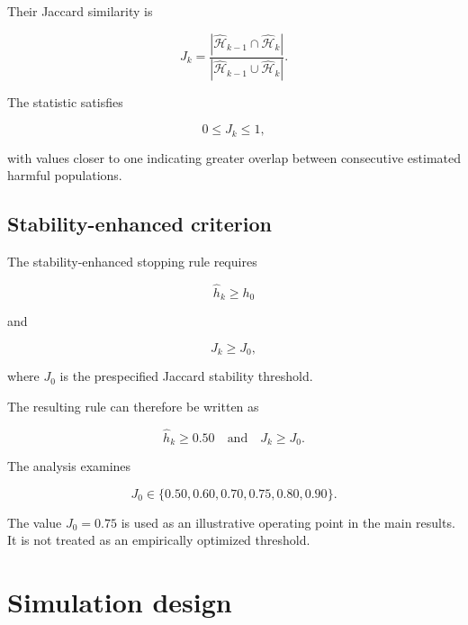 \documentclass[11pt,a4paper]{article}
\begin{document}
Their Jaccard similarity is

\begin{equation}
J_k
=
\frac{
|\widehat{\mathcal H}_{k-1}
\cap
\widehat{\mathcal H}_k|
}{
|\widehat{\mathcal H}_{k-1}
\cup
\widehat{\mathcal H}_k|
}.
\end{equation}

The statistic satisfies

\begin{equation}
0\leq J_k\leq1,
\end{equation}

with values closer to one indicating greater overlap between consecutive
estimated harmful populations.

\subsection{Stability-enhanced criterion}

The stability-enhanced stopping rule requires

\begin{equation}
\widehat h_k\geq h_0
\end{equation}

and

\begin{equation}
J_k\geq J_0,
\end{equation}

where $J_0$ is the prespecified Jaccard stability threshold.

The resulting rule can therefore be written as

\begin{equation}
\boxed{
\widehat h_k\geq 0.50
\quad\text{and}\quad
J_k\geq J_0.
}
\end{equation}

The analysis examines

\begin{equation}
J_0
\in
\{
0.50,0.60,0.70,0.75,0.80,0.90
\}.
\end{equation}

The value $J_0=0.75$ is used as an illustrative operating point in the main
results. It is not treated as an empirically optimized threshold.


\section{Simulation design}
\end{document}
